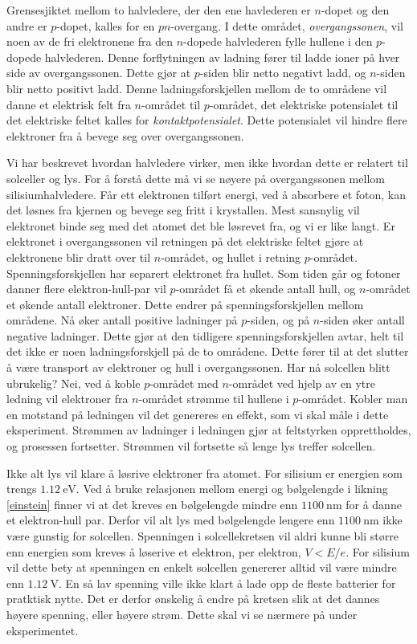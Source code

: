 \documentclass[%
 reprint,
 amsmath,amssymb,
 aps,
 norsk,
 booktabs
]{revtex4-1}
\begin{document}
Grensesjiktet mellom to halvledere, der den ene havlederen er $n$-dopet og den andre er $p$-dopet, kalles for en $pn$-overgang. I dette området, \textit{overgangssonen}, vil noen av de fri elektronene fra den $n$-dopede halvlederen fylle hullene i den $p$-dopede halvlederen. Denne forflytningen av ladning fører til ladde ioner på hver side av overgangssonen. Dette gjør at $p$-siden blir netto negativt ladd, og $n$-siden blir netto positivt ladd. Denne ladningsforskjellen mellom de to områdene vil danne et elektrisk felt fra $n$-området til $p$-området, det elektriske potensialet til det elektriske feltet kalles for \textit{kontaktpotensialet}. Dette potensialet vil hindre flere elektroner fra å bevege seg over overgangssonen.\par
Vi har beskrevet hvordan halvledere virker, men ikke hvordan dette er relatert til solceller og lys. For å  forstå dette må vi se nøyere på overgangssonen mellom silisiumhalvledere. Får ett elektronen tilført energi, ved å absorbere et foton, kan det løsnes fra kjernen og bevege seg fritt i krystallen. Mest sansnylig vil elektronet binde seg med det atomet det ble løsrevet fra, og vi er like langt. Er elektronet i overgangssonen vil retningen på det elektriske feltet gjøre at elektronene blir dratt over til $n$-området, og hullet i retning $p$-området. Spenningsforskjellen har separert elektronet fra hullet. Som tiden går og fotoner danner flere elektron-hull-par vil $p$-området få et økende antall hull, og $n$-området et økende antall elektroner. Dette endrer på spenningsforskjellen mellom områdene. Nå øker antall positive ladninger på $p$-siden, og på $n$-siden øker antall negative ladninger. Dette gjør at den tidligere spenningsforskjellen avtar, helt til det ikke er noen ladningsforskjell på de to områdene. Dette fører til at det slutter å være transport av elektroner og hull i overgangssonen. Har nå solcellen blitt ubrukelig? Nei, ved å koble $p$-området med $n$-området ved hjelp av en ytre ledning vil elektroner fra $n$-området strømme til hullene i $p$-området. Kobler man en motstand på ledningen vil det genereres en effekt, som vi skal måle i dette eksperiment. Strømmen av ladninger i ledningen gjør at feltstyrken opprettholdes, og prosessen fortsetter. Strømmen vil fortsette så lenge lys treffer solcellen.\par
Ikke alt lys vil klare å løsrive elektroner fra atomet. For silisium er energien som trengs $\SI{1.12}{\electronvolt}$. Ved å bruke relasjonen mellom energi og bølgelengde i likning \eqref{einstein} finner vi at det kreves en bølgelengde mindre enn $\SI{1100}{\nano\meter}$ for å danne et elektron-hull par. Derfor vil alt lys med bølgelengde lengere enn $\SI{1100}{\nano\meter}$ ikke være gunstig for solcellen. Spenningen i solcellekretsen vil aldri kunne bli større enn energien som kreves å løserive et elektron, per elektron, $V<E/e$. For silisium vil dette bety at spenningen en enkelt solcellen genererer alltid vil være mindre enn $\SI{1.12}{\volt}$. En så lav spenning ville ikke klart å lade opp de fleste batterier for pratktisk nytte. Det er derfor ønskelig å endre på kretsen slik at det dannes høyere spenning, eller høyere strøm. Dette skal vi se nærmere på under eksperimentet.
\end{document}
